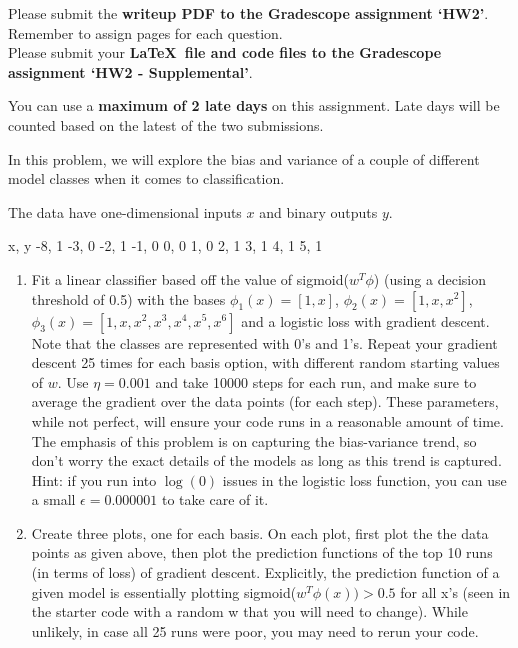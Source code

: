 \documentclass[submit]{harvardml}
\begin{document}
Please submit the \textbf{writeup PDF to the Gradescope assignment `HW2'}. Remember to assign pages for each question. \\

Please submit your \textbf{\LaTeX\ file and code files to the Gradescope assignment `HW2 - Supplemental'}. 

You can use a \textbf{maximum of 2 late days} on this assignment.  Late days will be counted based on the latest of the two submissions. \\

\begin{problem}
  In this problem, we will explore the bias and variance of a couple
  of different model classes when it comes to classification.

  The data have one-dimensional inputs $x$ and binary outputs $y$.
  
\begin{csv}
x, y
-8, 1
-3, 0
-2, 1
-1, 0
0, 0
1, 0
2, 1
3, 1
4, 1
5, 1
\end{csv} 

\begin{enumerate}

\item Fit a linear classifier based off the value of sigmoid($w^T \phi$)
 (using a decision threshold of 0.5) with the bases $\phi_1(x) = [1, x]$,
  $\phi_2(x) = [1, x, x^2]$, $\phi_3(x) = [1, x, x^2, x^3, x^4, x^5, x^6]$ and
  a logistic loss with gradient descent. Note that the classes are represented
  with 0's and 1's. 
  Repeat your gradient descent 25 times for each basis option, with different
   random starting values of $w$. Use $\eta=0.001$ and take 10000 steps
   for each run, and make sure to average the gradient over the data points
   (for each step). These parameters, while not perfect, will ensure your code
   runs in a reasonable amount of time. The emphasis of this problem is on
   capturing the bias-variance trend, so don't worry the exact details of the
   models as long as this trend is captured. Hint: if you run into $\log(0)$ issues
   in the logistic loss function, you can use a small $\epsilon=0.000001$ to take care of it.


\item Create three plots, one for each basis. On each plot, first plot the
  the data points as given above, then plot the prediction functions
  of the top 10 runs (in terms of loss) of gradient descent. Explicitly, 
  the prediction function of a given model is essentially plotting sigmoid($w^T \phi(x)) > 0.5$
  for all x's (seen in the starter code with a random w that you will need to change).
  While unlikely, in case all 25 runs were poor, you may need to rerun your code.
    

\end{enumerate}
\end{problem}
\end{document}
